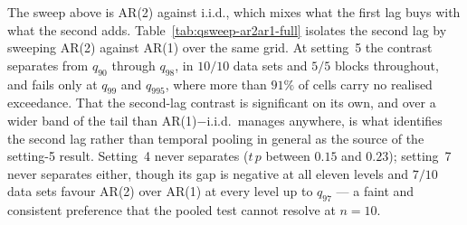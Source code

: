 \documentclass[11pt]{article}
\newcommand{\tblpath}{../../code/analysis/time_block_forecast/simstudy/output/tables}
\newcommand{\tbl}[1]{}
\begin{document}
The sweep above is AR(2) against i.i.d., which mixes what the first lag buys with what the second adds.  Table~\ref{tab:qsweep-ar2ar1-full} isolates the second lag by sweeping AR(2) against AR(1) over the same grid.  At setting~5 the contrast separates from $q_{90}$ through $q_{98}$, in $10/10$ data sets and $5/5$ blocks throughout, and fails only at $q_{99}$ and $q_{995}$, where more than $91\%$ of cells carry no realised exceedance.  That the second-lag contrast is significant on its own, and over a wider band of the tail than AR(1)$-$i.i.d.\ manages anywhere, is what identifies the second lag rather than temporal pooling in general as the source of the setting-5 result.  Setting~4 never separates ($t\,p$ between $0.15$ and $0.23$); setting~7 never separates either, though its gap is negative at all eleven levels and $7/10$ data sets favour AR(2) over AR(1) at every level up to $q_{97}$ --- a faint and consistent preference that the pooled test cannot resolve at $n = 10$.

\tbl{expA_qsweep_full_ar2ar1}
\end{document}
